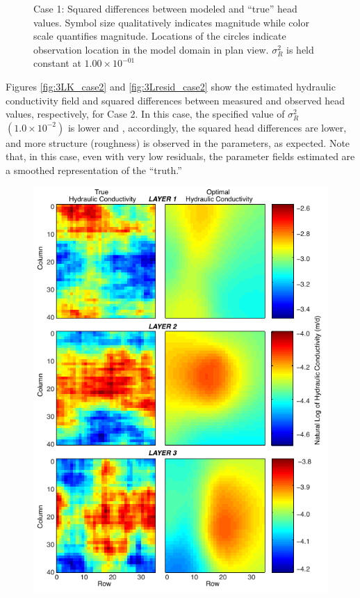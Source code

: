 \documentclass[11pt,oneside,onecolumn]{usgsreport}
\begin{document}
\begin{appendix}
\begin{figure}[!t]
\caption{\label{fig:3Lresid_case1}Case 1: Squared differences between modeled
and ``true'' head values. Symbol size qualitatively indicates magnitude
while color scale quantifies magnitude. Locations of the circles indicate
observation location in the model domain in plan view.  $\sigma_{R}^{2}$ is held constant at $1.00\times10^{-01}$}
\end{figure}


Figures \ref{fig:3LK_case2} and \ref{fig:3Lresid_case2} show the
estimated hydraulic conductivity field and squared differences between
measured and observed head values, respectively, for Case 2. In this
case, the specified value of $\sigma_{R}^{2}$ $\left(1.0\times10^{-2}\right)$
is lower and , accordingly, the squared head differences are lower,
and more structure (roughness) is observed in the parameters, as expected.
Note that, in this case, even with very low residuals, the parameter
fields estimated are a smoothed representation of the ``truth.'' 

\begin{figure}[!t]
\begin{center}\includegraphics{figures/3KL_case2}\end{center}


\end{figure}
\end{appendix}
\end{document}
